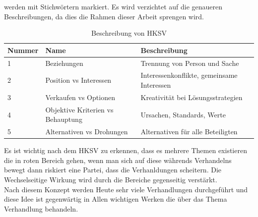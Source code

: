 werden mit Stichwörtern markiert. Es wird verzichtet auf die genaueren Beschreibungen, da dies die Rahmen dieser Arbeit sprengen wird.
\begin{table}[h]
\begin{center}
\begin{tabular}{|l|l|l|}\hline
\textbf{Nummer} & \textbf{Name} & \textbf{Beschreibung} \\
\hline\hline
1 & Beziehungen & Trennung von Person und Sache \\
\hline
2 & Position vs Interessen & Interessenkonflikte, gemeinsame Interessen \\
\hline
3 & Verkaufen vs Optionen & Kreativität bei Lösungsstrategien \\
\hline
4 & Objektive Kriterien vs Behauptung & Ursachen, Standards, Werte \\
\hline
5 & Alternativen vs Drohungen & Alternativen für alle Beteiligten \\
\hline
\end{tabular}
\caption{Beschreibung von HKSV}
\label{tab:beschreibungHKSV}
\end{center}
\end{table}
Es ist wichtig nach dem HKSV zu erkennen, dass es mehrere Themen existieren die in roten Bereich gehen, wenn man sich auf diese währends Verhandelns
bewegt dann riskiert eine Partei, dass die Verhanldungen scheitern. Die Wechselseitige Wirkung wird durch die Bereiche gegenseitig verstärkt. \\
Nach diesem Konzept werden Heute sehr viele Verhandlungen durchgeführt und diese Idee ist gegenwärtig in Allen wichtigen Werken die über das Thema
Verhandlung behandeln.
